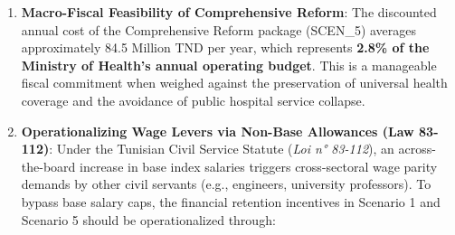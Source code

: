 \documentclass[
  11pt,
  a4paper]{article}
\providecommand{\tightlist}{%
  \setlength{\itemsep}{0pt}\setlength{\parskip}{0pt}}
\begin{document}
\begin{enumerate}
\def\labelenumi{\arabic{enumi}.}
\tightlist
\item
  \textbf{Macro-Fiscal Feasibility of Comprehensive Reform}: The
  discounted annual cost of the Comprehensive Reform package (SCEN\_5)
  averages approximately 84.5 Million TND per year, which represents
  \textbf{2.8\% of the Ministry of Health's annual operating budget}.
  This is a manageable fiscal commitment when weighed against the
  preservation of universal health coverage and the avoidance of public
  hospital service collapse.
\item
  \textbf{Operationalizing Wage Levers via Non-Base Allowances (Law
  83-112)}: Under the Tunisian Civil Service Statute (\emph{Loi n°
  83-112}), an across-the-board increase in base index salaries triggers
  cross-sectoral wage parity demands by other civil servants (e.g.,
  engineers, university professors). To bypass base salary caps, the
  financial retention incentives in Scenario 1 and Scenario 5 should be
  operationalized through:


\end{enumerate}
\end{document}
